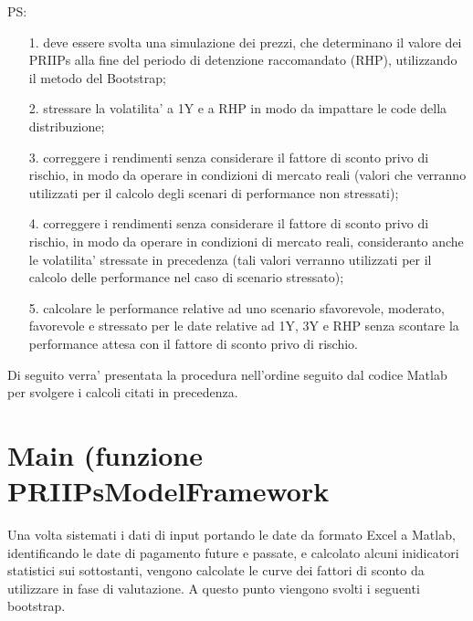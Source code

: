 \documentclass[11pt,fleqn]{extarticle}
\begin{document}
PS:
\begin{itemize}
\item[1.] deve essere svolta una simulazione dei prezzi, che determinano il valore dei PRIIPs alla fine del periodo di detenzione raccomandato (RHP), utilizzando il metodo del Bootstrap;
\item[2.] stressare la volatilita' a 1Y e a RHP in modo da impattare le code della distribuzione;
\item[3.] correggere i rendimenti senza considerare il fattore di sconto privo di rischio, in modo da operare in condizioni di mercato reali (valori che verranno utilizzati per il calcolo degli scenari di performance non stressati);
\item[4.] correggere i rendimenti senza considerare il fattore di sconto privo di rischio, in modo da operare in condizioni di mercato reali, consideranto anche le volatilita' stressate in precedenza (tali valori verranno utilizzati per il calcolo delle performance nel caso di scenario stressato);
\item[5.] calcolare le performance relative ad uno scenario sfavorevole, moderato, favorevole e stressato per le date relative ad 1Y, 3Y e RHP senza scontare la performance attesa con il fattore di sconto privo di rischio.
\end{itemize}
Di seguito verra' presentata la procedura nell'ordine seguito dal codice Matlab per svolgere i calcoli citati in precedenza.


\section{Main (funzione PRIIPsModelFramework}
Una volta sistemati i dati di input portando le date da formato Excel a Matlab, identificando le date di pagamento future e passate, e calcolato alcuni inidicatori statistici sui sottostanti, vengono calcolate le curve dei fattori di sconto da utilizzare in fase di valutazione.\newline
A questo punto viengono svolti i seguenti bootstrap.\newline
\end{document}
